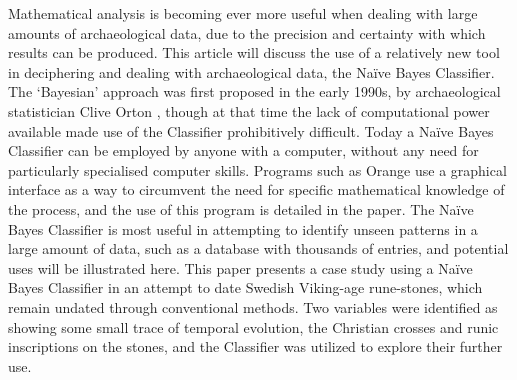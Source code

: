\begin{myabstract}
		Mathematical analysis is becoming ever more useful when dealing with large amounts of archaeological data, due to the precision and certainty with which results can be produced. This article will discuss the use of a relatively new tool in deciphering and dealing with archaeological data, the Naïve Bayes Classifier. The ‘Bayesian’ approach was first proposed in the early 1990s, by archaeological statistician Clive Orton \parencites[139]{Orton_1992}[1]{Buck_1996}, though at that time the lack of computational power available made use of the Classifier prohibitively difficult. Today a Naïve Bayes Classifier can be employed by anyone with a computer, without any need for particularly specialised computer skills. Programs such as Orange use a graphical interface as a way to circumvent the need for specific mathematical knowledge of the process, and the use of this program is detailed in the paper. The Naïve Bayes Classifier is most useful in attempting to identify unseen patterns in a large amount of data, such as a database with thousands of entries, and potential uses will be illustrated here. This paper presents a case study using a Naïve Bayes Classifier in an attempt to date Swedish Viking-age rune-stones, which remain undated through conventional methods. Two variables were identified as showing some small trace of temporal evolution, the Christian crosses and runic inscriptions on the stones, and the Classifier was utilized to explore their further use.
		

	\end{myabstract}
	

	
	

